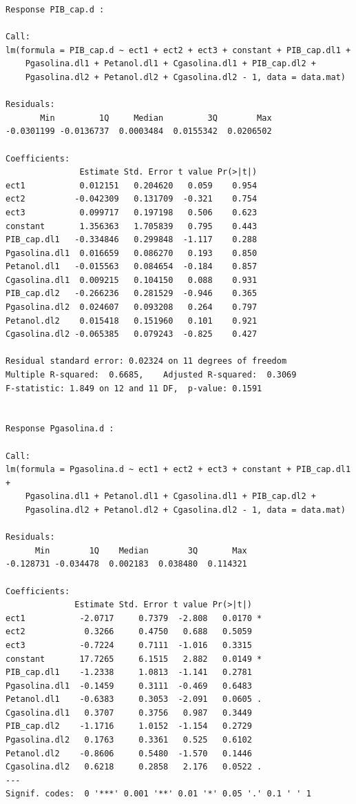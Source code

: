 \documentclass[
  letterpaper,
  DIV=11,
  numbers=noendperiod]{scrartcl}
\begin{document}
\begin{verbatim}
Response PIB_cap.d :

Call:
lm(formula = PIB_cap.d ~ ect1 + ect2 + ect3 + constant + PIB_cap.dl1 + 
    Pgasolina.dl1 + Petanol.dl1 + Cgasolina.dl1 + PIB_cap.dl2 + 
    Pgasolina.dl2 + Petanol.dl2 + Cgasolina.dl2 - 1, data = data.mat)

Residuals:
       Min         1Q     Median         3Q        Max 
-0.0301199 -0.0136737  0.0003484  0.0155342  0.0206502 

Coefficients:
               Estimate Std. Error t value Pr(>|t|)
ect1           0.012151   0.204620   0.059    0.954
ect2          -0.042309   0.131709  -0.321    0.754
ect3           0.099717   0.197198   0.506    0.623
constant       1.356363   1.705839   0.795    0.443
PIB_cap.dl1   -0.334846   0.299848  -1.117    0.288
Pgasolina.dl1  0.016659   0.086270   0.193    0.850
Petanol.dl1   -0.015563   0.084654  -0.184    0.857
Cgasolina.dl1  0.009215   0.104150   0.088    0.931
PIB_cap.dl2   -0.266236   0.281529  -0.946    0.365
Pgasolina.dl2  0.024607   0.093208   0.264    0.797
Petanol.dl2    0.015418   0.151960   0.101    0.921
Cgasolina.dl2 -0.065385   0.079243  -0.825    0.427

Residual standard error: 0.02324 on 11 degrees of freedom
Multiple R-squared:  0.6685,    Adjusted R-squared:  0.3069 
F-statistic: 1.849 on 12 and 11 DF,  p-value: 0.1591


Response Pgasolina.d :

Call:
lm(formula = Pgasolina.d ~ ect1 + ect2 + ect3 + constant + PIB_cap.dl1 + 
    Pgasolina.dl1 + Petanol.dl1 + Cgasolina.dl1 + PIB_cap.dl2 + 
    Pgasolina.dl2 + Petanol.dl2 + Cgasolina.dl2 - 1, data = data.mat)

Residuals:
      Min        1Q    Median        3Q       Max 
-0.128731 -0.034478  0.002183  0.038480  0.114321 

Coefficients:
              Estimate Std. Error t value Pr(>|t|)  
ect1           -2.0717     0.7379  -2.808   0.0170 *
ect2            0.3266     0.4750   0.688   0.5059  
ect3           -0.7224     0.7111  -1.016   0.3315  
constant       17.7265     6.1515   2.882   0.0149 *
PIB_cap.dl1    -1.2338     1.0813  -1.141   0.2781  
Pgasolina.dl1  -0.1459     0.3111  -0.469   0.6483  
Petanol.dl1    -0.6383     0.3053  -2.091   0.0605 .
Cgasolina.dl1   0.3707     0.3756   0.987   0.3449  
PIB_cap.dl2    -1.1716     1.0152  -1.154   0.2729  
Pgasolina.dl2   0.1763     0.3361   0.525   0.6102  
Petanol.dl2    -0.8606     0.5480  -1.570   0.1446  
Cgasolina.dl2   0.6218     0.2858   2.176   0.0522 .
---
Signif. codes:  0 '***' 0.001 '**' 0.01 '*' 0.05 '.' 0.1 ' ' 1


\end{verbatim}
\end{document}
